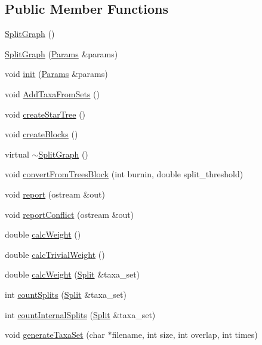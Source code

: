 \subsection*{Public Member Functions}
\begin{DoxyCompactItemize}
\item 
\hyperlink{classSplitGraph_aea160f196766a6573809410979e0df5b}{SplitGraph} ()
\item 
\hyperlink{classSplitGraph_aec55fe3e947b56545f57c9c596ec20a3}{SplitGraph} (\hyperlink{structParams}{Params} \&params)
\item 
void \hyperlink{classSplitGraph_a0111a637ecb711d90f2f15ce734a96c8}{init} (\hyperlink{structParams}{Params} \&params)
\item 
void \hyperlink{classSplitGraph_adb64089273f29e935d82a5fc74289792}{AddTaxaFromSets} ()
\item 
void \hyperlink{classSplitGraph_af306b9e7b96b0fc89d664548e2b6769a}{createStarTree} ()
\item 
void \hyperlink{classSplitGraph_a05d34dc9d03a3aed2e195b64acd698b0}{createBlocks} ()
\item 
virtual \hyperlink{classSplitGraph_a40780d552131a67c8cdb5b20037dbd16}{$\sim$SplitGraph} ()
\item 
void \hyperlink{classSplitGraph_a9cc756e24638ce4b7f78605c8ccb6543}{convertFromTreesBlock} (int burnin, double split\_\-threshold)
\item 
void \hyperlink{classSplitGraph_abd01f1db37dbb2c97becef1b38032dd9}{report} (ostream \&out)
\item 
void \hyperlink{classSplitGraph_a1876d549d833982752e4ad2e263ec6d4}{reportConflict} (ostream \&out)
\item 
double \hyperlink{classSplitGraph_aaff18dd254098b4e1912593f0e2de524}{calcWeight} ()
\item 
double \hyperlink{classSplitGraph_a8ef03a25d1057fb09e2da7d9b3a28035}{calcTrivialWeight} ()
\item 
double \hyperlink{classSplitGraph_a9404a37b5c287146c432b7ca28c0ed6e}{calcWeight} (\hyperlink{classSplit}{Split} \&taxa\_\-set)
\item 
int \hyperlink{classSplitGraph_a9e3db1bb803fc6ee62082eae9978057d}{countSplits} (\hyperlink{classSplit}{Split} \&taxa\_\-set)
\item 
int \hyperlink{classSplitGraph_a8124b259486ab72f1a53119b11001805}{countInternalSplits} (\hyperlink{classSplit}{Split} \&taxa\_\-set)
\item 
void \hyperlink{classSplitGraph_aee545f263532bb4d56109fa43455a50a}{generateTaxaSet} (char $\ast$filename, int size, int overlap, int times)

\end{DoxyCompactItemize}
